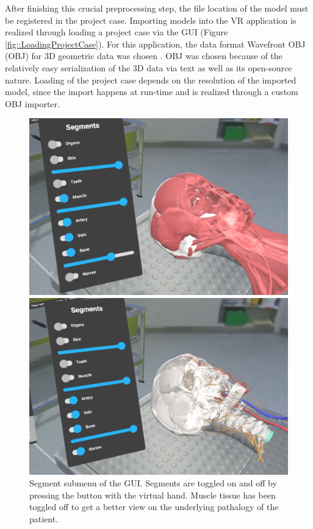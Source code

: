 After finishing this crucial preprocessing step, the file location of the model must be registered in the project case.
Importing models into the VR application is realized through loading a project case via the GUI (Figure \ref{fig::LoadingProjectCase}).
For this application, the data format Wavefront OBJ (OBJ) for 3D geometric data was chosen \cite{WavefrontOBJ}.
OBJ was chosen because of the relatively easy serialization of the 3D data via text as well as its open-source nature. 
Loading of the project case depends on the resolution of the imported model, since the import happens at run-time and is realized through a custom OBJ importer. 

\begin{figure}[ht]
  \centering
  \begin{minipage}{.5\textwidth}
    \centering
    \includegraphics[width=0.99\linewidth]{images/implementation/features/visualization/segments_1.png}
  \end{minipage}%
  \begin{minipage}{.5\textwidth}
    \centering
    \includegraphics[width=0.99\linewidth]{images/implementation/features/visualization/segments_2.png}
  \end{minipage}
  \caption{\label{fig::Segmentation}Segment submenu of the GUI. Segments are toggled on and off by pressing the button with the virtual hand. Muscle tissue has been toggled off to get a better view on the underlying pathalogy of the patient.}
\end{figure}


